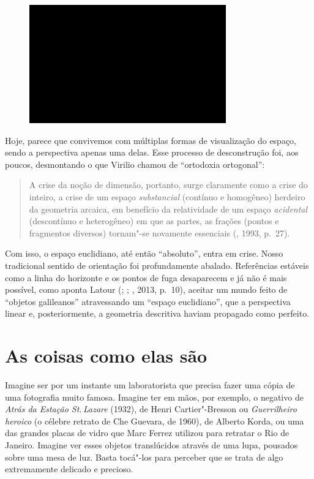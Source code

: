 \begin{figure}[!ht]
\centering
 \includegraphics[width=85mm]{./imgs/im1.jpg}
\caption{\tiny{}} 
\end{figure}

Hoje, parece que convivemos com múltiplas formas de visualização do
espaço, sendo a perspectiva apenas uma delas. Esse processo de
desconstrução foi, aos poucos, desmontando o que Virilio chamou de
``ortodoxia ortogonal'':

\begin{quote}
A crise da noção de dimensão, portanto, surge claramente como a crise do
inteiro, a crise de um espaço \emph{substancial} (contínuo e homogêneo)
herdeiro da geometria arcaica, em benefício da relatividade de um espaço
\emph{acidental} (descontínuo e heterogêneo) em que as partes, as
frações (pontos e fragmentos diversos) tornam"-se novamente essenciais
(, 1993, p.~27).
\end{quote}

Com isso, o espaço euclidiano, até então ``absoluto'', entra em crise.
Nosso tradicional sentido de orientação foi profundamente abalado.
Referências estáveis como a linha do horizonte e os pontos de fuga
desaparecem e já não é mais possível, como aponta Latour (;
; , 2013, p.~10), aceitar um mundo feito de
``objetos galileanos'' atravessando um ``espaço euclidiano'', que a
perspectiva linear e, posteriormente, a geometria descritiva haviam
propagado como perfeito.

\chapter{As coisas como elas são}

Imagine ser por um instante um laboratorista que precisa fazer uma cópia
de uma fotografia muito famosa. Imagine ter em mãos, por exemplo, o
negativo de \emph{Atrás da Estação St.\,Lazare} (1932), de Henri Cartier"-Bresson ou \emph{Guerrilheiro heroico} (o célebre retrato de Che
Guevara, de 1960), de Alberto Korda, ou uma das grandes placas de vidro
que Marc Ferrez utilizou para retratar o Rio de Janeiro. Imagine ver
esses objetos translúcidos através de uma lupa, pousados sobre uma mesa
de luz. Basta tocá"-los para perceber que se trata de algo extremamente
delicado e precioso.

